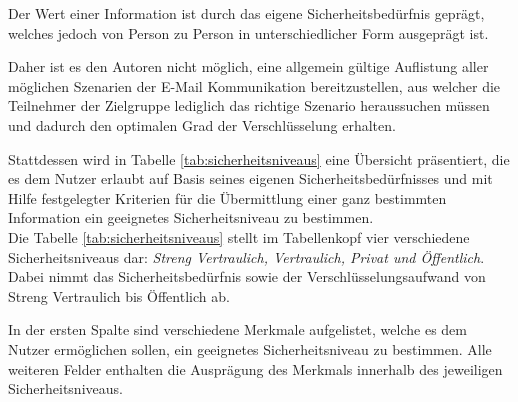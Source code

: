 \documentclass  [paper=a4,
				fontsize=12pt,
				listof=totoc,
				bibliography=totoc
				]{scrreprt}
\begin{document}
	
		Der Wert einer Information ist durch das eigene Sicherheitsbedürfnis geprägt, welches jedoch von Person zu Person in unterschiedlicher Form ausgeprägt ist.
		
		Daher ist es den Autoren nicht möglich, eine allgemein gültige Auflistung aller möglichen Szenarien der E-Mail Kommunikation bereitzustellen, aus welcher die Teilnehmer der Zielgruppe lediglich das richtige Szenario heraussuchen müssen und dadurch den optimalen Grad der Verschlüsselung erhalten. 
		
		Stattdessen wird in Tabelle \ref{tab:sicherheitsniveaus} eine Übersicht präsentiert, die es dem Nutzer erlaubt auf Basis seines eigenen Sicherheitsbedürfnisses und mit Hilfe festgelegter Kriterien für die Übermittlung einer ganz bestimmten Information ein geeignetes Sicherheitsniveau zu bestimmen. 
		\medskip\\
		
		
	
		
		Die Tabelle \ref{tab:sicherheitsniveaus} stellt im Tabellenkopf vier verschiedene Sicherheitsniveaus dar: \textit{Streng Vertraulich, Vertraulich, Privat und Öffentlich}. Dabei nimmt das Sicherheitsbedürfnis sowie der Verschlüsselungsaufwand von Streng Vertraulich bis Öffentlich ab.
		
		In der ersten Spalte sind verschiedene Merkmale aufgelistet, welche es dem Nutzer ermöglichen sollen, 
		ein geeignetes Sicherheitsniveau zu bestimmen.
		Alle weiteren Felder enthalten die Ausprägung des Merkmals innerhalb des jeweiligen Sicherheitsniveaus.
		\medskip\\
		
\end{document}
